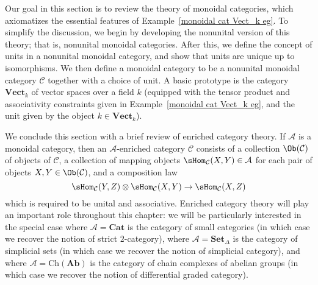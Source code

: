 Our goal in this section is to review the theory of monoidal categories, which axiomatizes the essential features of Example~\ref{monoidal cat Vect_k eg}. To simplify the discussion, we begin by developing the nonunital version of this theory; that is, nonunital monoidal categories. After this, we define the concept of units in a nonunital monoidal category, and show that units are unique up to isomorphisms. We then define a monoidal category to be a nonunital monoidal category $\mathcal{C}$ together with a choice of unit. A basic prototype is the category $\mathbf{Vect}_k$ of vector spaces over a field $k$ (equipped with the tensor product and associativity constraints given in Example~\ref{monoidal cat Vect_k eg}, and the unit given by the object $k\in\mathbf{Vect}_k$).\par
We conclude this section with a brief review of enriched category theory. If $\mathcal{A}$ is a monoidal category, then an $\mathcal{A}$-enriched category $\mathcal{C}$ consists of a collection $\Ob(\mathcal{C})$ of objects of $\mathcal{C}$, a collection of mapping objects $\sHom_{\mathcal{C}}(X,Y)\in\mathcal{A}$ for each pair of objects $X,Y\in\Ob(\mathcal{C})$, and a composition law
\[\sHom_{\mathcal{C}}(Y,Z)\otimes\sHom_{\mathcal{C}}(X,Y)\to\sHom_{\mathcal{C}}(X,Z)\]
which is required to be unital and associative. Enriched category theory will play an important role throughout this chapter: we will be particularly interested in the special case where $\mathcal{A}=\mathbf{Cat}$ is the category of small categories (in which case we recover the notion of strict $2$-category), where $\mathcal{A}=\mathbf{Set}_\Delta$ is the category of simplicial sets (in which case we recover the notion of simplicial category), and where $\mathcal{A}=\mathrm{Ch}(\mathbf{Ab})$ is the category of chain complexes of abelian groups (in which case we recover the notion of differential graded category).
